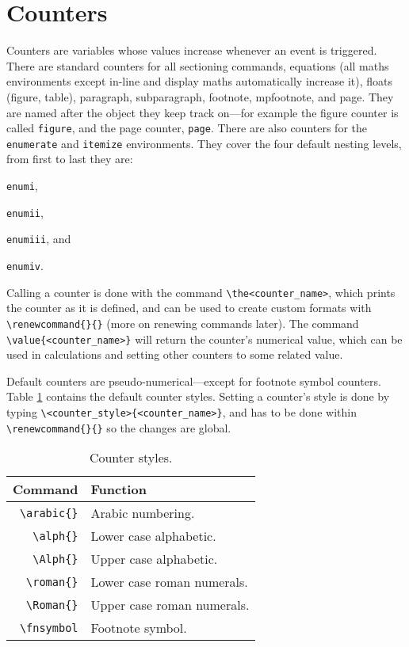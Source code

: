 \section{Counters}\label{s:counters}
%
Counters are variables whose values increase whenever an event is
triggered.  There are standard counters for all sectioning commands,
equations (all maths environments except in-line and display maths
automatically increase it), floats (figure, table), paragraph,
subparagraph, footnote, mpfootnote, and page.  They are named after
the object they keep track on---for example the figure counter is
called \verb|figure|, and the page counter, \verb|page|.  There are
also counters for the \verb|enumerate| and \verb|itemize|
environments.  They cover the four default nesting levels, from first
to last they are:
\begin{inparaenum}[\itshape 1\upshape)]
\item \verb|enumi|,
\item \verb|enumii|,
\item \verb|enumiii|, and
\item \verb|enumiv|.
\end{inparaenum}

Calling a counter is done with the command \verb|\the<counter_name>|,
which prints the counter as it is defined, and can be used to create
custom formats with \verb|\renewcommand{}{}| (more on renewing
commands later).  The command \verb|\value{<counter_name>}| will
return the counter's numerical value, which can be used in
calculations and setting other counters to some related value.

Default counters are pseudo-numerical---except for footnote symbol
counters.  Table \ref{t:countsymb} contains the default counter
styles.  Setting a counter's style is done by typing
\verb|\<counter_style>{<counter_name>}|, and has to be done within
\verb|\renewcommand{}{}| so the changes are global.
\begin{table}[!htbp]
  \centering
  \caption{Counter styles.}
  \label{t:countsymb}
  \begin{tabular}{rl}
    \toprule
    Command & Function \\
    \midrule
    \verb|\arabic{}| & Arabic numbering. \\
    \verb|\alph{}| & Lower case alphabetic. \\
    \verb|\Alph{}| & Upper case alphabetic. \\
    \verb|\roman{}| & Lower case roman numerals. \\
    \verb|\Roman{}| & Upper case roman numerals. \\
    \verb|\fnsymbol| & Footnote symbol. \\
    \bottomrule
  \end{tabular}
\end{table}

